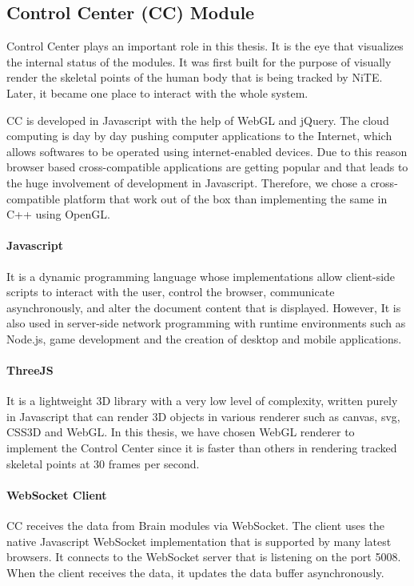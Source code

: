 \subsection{Control Center (CC) Module} Control Center plays an important role in this thesis. It is the eye that visualizes the internal status of the modules. It was first built for the purpose of visually render the skeletal points of the human body that is being tracked by NiTE. Later, it became one place to interact with the whole system. 

CC is developed in Javascript with the help of WebGL and jQuery. The cloud computing is day by day pushing computer applications to the Internet, which allows softwares to be operated using internet-enabled devices. Due to this reason browser based cross-compatible applications are getting popular and that leads to the huge involvement of development in Javascript. Therefore, we chose a cross-compatible platform that work out of the box than implementing the same in C++ using OpenGL.



\paragraph*{Javascript} It is a dynamic programming language whose implementations allow client-side scripts to interact with the user, control the browser, communicate asynchronously, and alter the document content that is displayed. However, It is also used in server-side network programming with runtime environments such as Node.js, game development and the creation of desktop and mobile applications.

\paragraph*{ThreeJS} It is a lightweight 3D library with a very low level of complexity, written purely in Javascript that can render 3D objects in various renderer such as canvas, svg, CSS3D and WebGL. In this thesis, we have chosen WebGL renderer to implement the Control Center since it is faster than others in rendering tracked skeletal points at 30 frames per second.

\paragraph*{WebSocket Client} CC receives the data from Brain modules via WebSocket. The client uses the native Javascript WebSocket implementation that is supported by many latest browsers. It connects to the WebSocket server that is listening on the port 5008. When the client receives the data, it updates the data buffer asynchronously.

